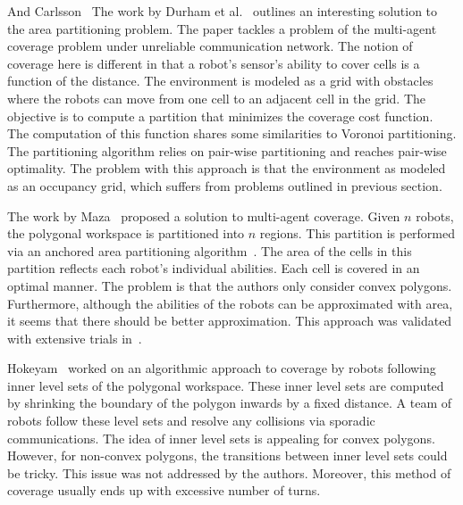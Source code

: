 \documentclass[../main.tex]{subfiles}
\begin{document}
And Carlsson~\cite{carlsson2012dividing}
The work by Durham et al.~\cite{durham2012discrete} outlines an interesting solution to the area partitioning problem. The paper tackles a problem of the multi-agent coverage problem under unreliable communication network. The notion of coverage here is different in that a robot's sensor's ability to cover cells is a function of the distance. The environment is modeled as a grid with obstacles where the robots can move from one cell to an adjacent cell in the grid. The objective is to compute a partition that minimizes the coverage cost function. The computation of this function shares some similarities to Voronoi partitioning. The partitioning algorithm relies on pair-wise partitioning and reaches pair-wise optimality. The problem with this approach is that the environment as modeled as an occupancy grid, which suffers from problems outlined in previous section. 

The work by Maza~\cite{maza2007multiple} proposed a solution to multi-agent coverage. Given $n$ robots, the polygonal workspace is partitioned into $n$ regions. This partition is performed via an anchored area partitioning algorithm~\cite{hert1998polygon}. The area of the cells in this partition reflects each robot's individual abilities. Each cell is covered in an optimal manner. The problem is that the authors only consider convex polygons. Furthermore, although the abilities of the robots can be approximated with area, it seems that there should be better approximation. This approach was validated with extensive trials in~\cite{barrientos2011aerial}.


Hokeyam~\cite{hokayem2007dynamic} worked on an algorithmic approach to coverage by robots following inner level sets of the polygonal workspace. These inner level sets are computed by shrinking the boundary of the polygon inwards by a fixed distance. A team of robots follow these level sets and resolve any collisions via sporadic communications. The idea of inner level sets is appealing for convex polygons. However, for non-convex polygons, the transitions between inner level sets could be tricky. This issue was not addressed by the authors. Moreover, this method of coverage usually ends up with excessive number of turns.
\end{document}
